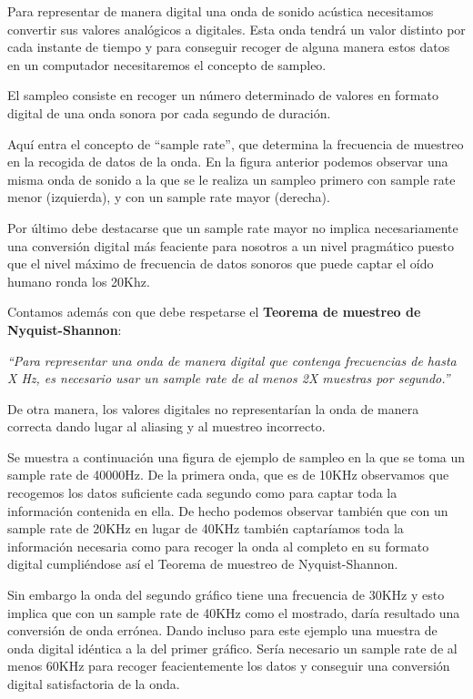 Para representar de manera digital una onda de sonido acústica necesitamos convertir sus valores analógicos a digitales. Esta onda tendrá un valor distinto por cada instante de tiempo y para conseguir recoger de alguna manera estos datos en un computador necesitaremos el concepto de sampleo.

El sampleo consiste en recoger un número determinado de valores en formato digital de una onda sonora por cada segundo de duración.


Aquí entra el concepto de ``sample rate'', que determina la frecuencia de muestreo en la recogida de datos de la onda. En la figura anterior podemos observar una misma onda de sonido a la que se le realiza un sampleo primero con sample rate menor (izquierda), y con un sample rate mayor (derecha).

Por último debe destacarse que un sample rate mayor no implica necesariamente una conversión digital más feaciente para nosotros a un nivel pragmático puesto que el nivel máximo de frecuencia de datos sonoros que puede captar el oído humano ronda los 20Khz. 

Contamos además con que debe respetarse el \textbf{Teorema de muestreo de Nyquist-Shannon}:\bigskip

\textsl{``Para representar una onda de manera digital que contenga frecuencias de hasta X Hz, es necesario usar un sample rate de al menos 2X muestras por segundo.''}\bigskip

De otra manera, los valores digitales no representarían la onda de manera correcta dando lugar al aliasing y al muestreo incorrecto.

Se muestra a continuación una figura de ejemplo de sampleo en la que se toma un sample rate de 40000Hz. De la primera onda, que es de 10KHz observamos que recogemos los datos suficiente cada segundo como para captar toda la información contenida en ella. De hecho podemos observar también que con un sample rate de 20KHz en lugar de 40KHz también captaríamos toda la información necesaria como para recoger la onda al completo en su formato digital cumpliéndose así el Teorema de muestreo de Nyquist-Shannon.

Sin embargo la onda del segundo gráfico tiene una frecuencia de 30KHz y esto implica que con un sample rate de 40KHz como el mostrado, daría resultado una conversión de onda errónea. Dando incluso para este ejemplo una muestra de onda digital idéntica a la del primer gráfico. Sería necesario un sample rate de al menos 60KHz para recoger feacientemente los datos y conseguir una conversión digital satisfactoria de la onda.\pagebreak

